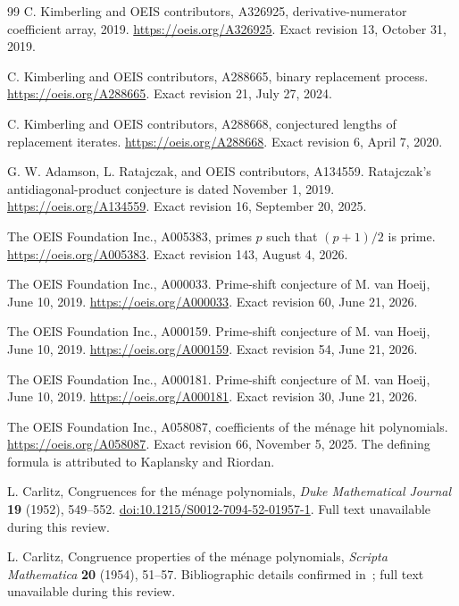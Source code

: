 \documentclass[11pt]{article}
\begin{document}
\begin{thebibliography}{99}
 C. Kimberling and OEIS contributors,
A326925, derivative-numerator coefficient array, 2019.
\url{https://oeis.org/A326925}. Exact revision 13, October 31, 2019.

 C. Kimberling and OEIS contributors,
A288665, binary replacement process.
\url{https://oeis.org/A288665}. Exact revision 21, July 27, 2024.

 C. Kimberling and OEIS contributors,
A288668, conjectured lengths of replacement iterates.
\url{https://oeis.org/A288668}. Exact revision 6, April 7, 2020.

 G. W. Adamson, L. Ratajczak, and OEIS contributors,
A134559. Ratajczak's antidiagonal-product conjecture is dated
November 1, 2019. \url{https://oeis.org/A134559}.
Exact revision 16, September 20, 2025.

 The OEIS Foundation Inc., A005383,
primes $p$ such that $(p+1)/2$ is prime.
\url{https://oeis.org/A005383}. Exact revision 143, August 4, 2026.

 The OEIS Foundation Inc., A000033.
Prime-shift conjecture of M. van Hoeij, June 10, 2019.
\url{https://oeis.org/A000033}. Exact revision 60, June 21, 2026.

 The OEIS Foundation Inc., A000159.
Prime-shift conjecture of M. van Hoeij, June 10, 2019.
\url{https://oeis.org/A000159}. Exact revision 54, June 21, 2026.

 The OEIS Foundation Inc., A000181.
Prime-shift conjecture of M. van Hoeij, June 10, 2019.
\url{https://oeis.org/A000181}. Exact revision 30, June 21, 2026.

 The OEIS Foundation Inc., A058087,
coefficients of the m\'enage hit polynomials.
\url{https://oeis.org/A058087}. Exact revision 66, November 5, 2025.
The defining formula is attributed to Kaplansky and Riordan.

 L. Carlitz, Congruences for the m\'enage polynomials,
\emph{Duke Mathematical Journal} \textbf{19} (1952), 549--552.
\href{https://doi.org/10.1215/S0012-7094-52-01957-1}{doi:10.1215/S0012-7094-52-01957-1}.
Full text unavailable during this review.

 L. Carlitz, Congruence properties of the m\'enage
polynomials, \emph{Scripta Mathematica} \textbf{20} (1954), 51--57.
Bibliographic details confirmed in~\cite{WymanMoser1958}; full text
unavailable during this review.


\end{thebibliography}
\end{document}
